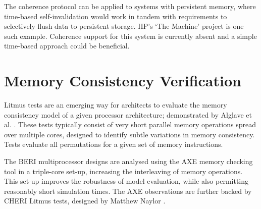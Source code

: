 		The coherence protocol can be applied to systems with persistent memory, where time-based self-invalidation would work in tandem with requirements to selectively flush data to persistent storage. HP's `The Machine' project \cite{hp_the_machine} is one such example. Coherence support for this system is currently absent and a simple time-based approach could be beneficial.




















\chapter{Memory Consistency Verification}
\label{chapter_validation}

		Litmus tests are an emerging way for architects to evaluate the memory consistency model of a given processor architecture; demonstrated by Alglave et al. \cite{Alglave11}. These tests typically consist of very short parallel memory operations spread over multiple cores, designed to identify subtle variations in memory consistency. Tests evaluate all permutations for a given set of memory instructions. 
		
		The BERI multiprocessor designs are analysed using the AXE memory checking tool in a triple-core set-up, increasing the interleaving of memory operations. 
		This set-up improves the robustness of model evaluation, while also permitting reasonably short simulation times. The AXE observations are further backed by CHERI Litmus tests, designed by Matthew Naylor \cite{CHERI_litmus}. 
		
